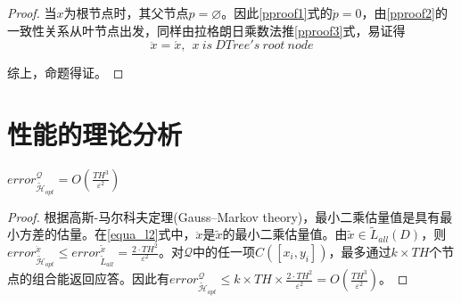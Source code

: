 \begin{proof}
	当$x$为根节点时，其父节点$p = \varnothing$。因此\ref{pproof1}式的$\ddot{p} = 0$，由\ref{pproof2}的一致性关系从叶节点出发，同样由拉格朗日乘数法推\ref{pproof3}式，易证得
	\[
	\ddot{x} = \acute{x},\ \ x\ is\ DTree's\ root\ node
	\]
	
	综上，命题得证。
\end{proof}

\section{性能的理论分析}

\begin{prop}
	$error_{\tilde{\mathcal{H}}_{opt}}^{\mathcal{Q}} = O(\frac{TH^3}{\varepsilon^2})$
\end{prop}
\begin{proof}
	根据高斯-马尔科夫定理(Gauss–Markov theory)\supercite{gauss_markov}，最小二乘估量值是具有最小方差的估量。在\ref{equa_l2}式中，$\ddot{x}$是$\tilde{x}$的最小二乘估量值。由$\tilde{x} \in \tilde{L}_{all}(D)$，则$error_{\tilde{\mathcal{H}}_{opt}}^{\ddot{x}} \leqslant error_{\tilde{L}_{all}}^{\tilde{x}} = \frac{2 \cdotp TH^2}{\varepsilon^2}$。对$\mathcal{Q}$中的任一项$C([x_{i},y_{i}])$，最多通过$k\times TH$个节点的组合能返回应答。因此有$error_{\tilde{\mathcal{H}}_{opt}}^{\mathcal{Q}} \leqslant k \times TH \times \frac{2 \cdotp TH^2}{\varepsilon^2} = O(\frac{TH^3}{\varepsilon^2})$。
\end{proof}

